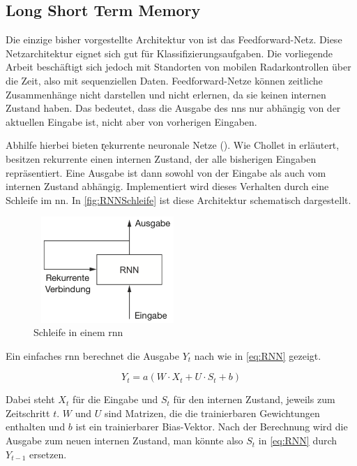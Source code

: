 \subsection{Long Short Term Memory}
\label{sec:LSTM}

Die einzige bisher vorgestellte Architektur von  ist das Feedforward-Netz.
Diese Netzarchitektur eignet sich gut für Klassifizierungsaufgaben.
Die vorliegende Arbeit beschäftigt sich jedoch mit Standorten von mobilen Radarkontrollen über die Zeit, also mit sequenziellen Daten.
Feedforward-Netze können zeitliche Zusammenhänge nicht darstellen und nicht erlernen, da sie keinen internen Zustand haben.
Das bedeutet, dass die Ausgabe des \acrshort{nn}s nur abhängig von der aktuellen Eingabe ist, nicht aber von vorherigen Eingaben.

Abhilfe hierbei bieten \k{rekurrente neuronale Netze} ().
Wie Chollet in \cite[S. 252]{DeepLearningPythonKeras} erläutert, besitzen rekurrente  einen internen Zustand, der alle bisherigen Eingaben repräsentiert.
Eine Ausgabe ist dann sowohl von der Eingabe als auch vom internen Zustand abhängig.
Implementiert wird dieses Verhalten durch eine Schleife im \acrshort{nn}.
In \autoref{fig:RNNSchleife} ist diese Architektur schematisch dargestellt.

\begin{figure}[h]
    \centering
    \includegraphics[width=0.5\textwidth,height=4cm,keepaspectratio=true]{content/images/RNNSchleife.png}
    \caption{Schleife in einem \acrshort{rnn} \cite[Abb. 6.9]{DeepLearningPythonKeras}}
    \label{fig:RNNSchleife}
\end{figure}

Ein einfaches \acrshort{rnn} berechnet die Ausgabe $Y_t$ nach \cite[S. 253]{DeepLearningPythonKeras} wie in \autoref{eq:RNN} gezeigt.

\begin{equation}
    Y_t = a(W \cdot X_t + U \cdot S_t + b)
\label{eq:RNN}
\end{equation}

Dabei steht $X_t$ für die Eingabe und $S_t$ für den internen Zustand, jeweils zum Zeitschritt $t$.
$W$ und $U$ sind Matrizen, die die trainierbaren Gewichtungen enthalten und $b$ ist ein trainierbarer Bias-Vektor.
Nach der Berechnung wird die Ausgabe zum neuen internen Zustand, man könnte also $S_t$ in \autoref{eq:RNN} durch $Y_{t-1}$ ersetzen.

